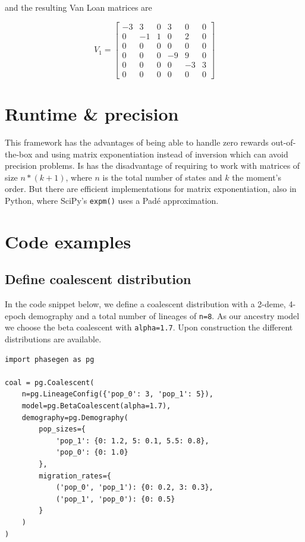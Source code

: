 \documentclass[hidelinks,11pt]{article}
\begin{document}
and the resulting Van Loan matrices are

\begin{equation*}
V_1 = \left[ \begin{array}{ccc|ccc}
-3 & 3 & 0 & 3 & 0 & 0 \\
0 & -1 & 1 & 0 & 2 & 0 \\
0 & 0 & 0 & 0 & 0 & 0 \\
\hline
0 & 0 & 0 & -9 & 9 & 0 \\
0 & 0 & 0 & 0 & -3 & 3 \\
0 & 0 & 0 & 0 & 0 & 0
\end{array} \right]
\end{equation*}


\section{Runtime \& precision}

This framework has the advantages of being able to handle zero rewards out-of-the-box and using matrix exponentiation instead of inversion which can avoid precision problems. Is has the disadvantage of requiring to work with matrices of size $n * (k + 1)$, where $n$ is the total number of states and $k$ the moment's order. But there are efficient implementations for matrix exponentiation, also in Python, where SciPy's \texttt{expm()} uses a Padé approximation.

\section{Code examples}

\subsection{Define coalescent distribution}
In the code snippet below, we define a coalescent distribution with a 2-deme, 4-epoch demography and a total number of lineages of \texttt{n=8}. As our ancestry model we choose the beta coalescent with \texttt{alpha=1.7}. Upon construction the different distributions are available.
\begin{verbatim}
import phasegen as pg

coal = pg.Coalescent(
    n=pg.LineageConfig({'pop_0': 3, 'pop_1': 5}),
    model=pg.BetaCoalescent(alpha=1.7),
    demography=pg.Demography(
        pop_sizes={
            'pop_1': {0: 1.2, 5: 0.1, 5.5: 0.8},
            'pop_0': {0: 1.0}
        },
        migration_rates={
            ('pop_0', 'pop_1'): {0: 0.2, 3: 0.3},
            ('pop_1', 'pop_0'): {0: 0.5}
        }
    )
)

\end{verbatim}
\end{document}
